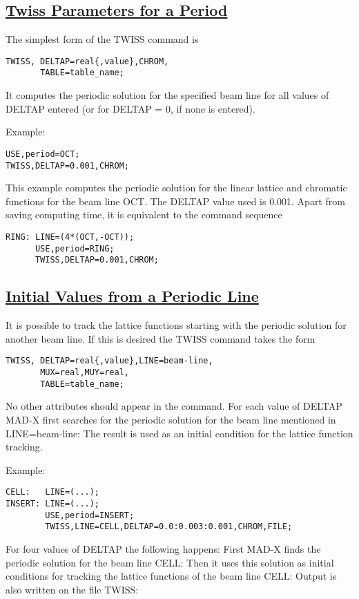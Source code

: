 \subsection{\href{periodic}{Twiss Parameters for a Period}} The simplest form of the TWISS command is 
\begin{verbatim}
TWISS, DELTAP=real{,value},CHROM,
       TABLE=table_name;
\end{verbatim} It computes the periodic solution for the specified beam line for all values of DELTAP entered (or for DELTAP = 0, if none is entered). 

Example: 
\begin{verbatim}
USE,period=OCT;
TWISS,DELTAP=0.001,CHROM;
\end{verbatim} This example computes the periodic solution for the linear lattice and chromatic functions for the beam line OCT. The DELTAP value used is 0.001. Apart from saving computing time, it is equivalent to the command sequence 
\begin{verbatim}
RING: LINE=(4*(OCT,-OCT));
      USE,period=RING;
      TWISS,DELTAP=0.001,CHROM;
\end{verbatim}

\subsection{\href{line}{Initial Values from a Periodic Line}} It is possible to track the lattice functions starting with the periodic solution for another beam line. If this is desired the TWISS command takes the form 
\begin{verbatim}
TWISS, DELTAP=real{,value},LINE=beam-line,
       MUX=real,MUY=real,
       TABLE=table_name;
\end{verbatim} No other attributes should appear in the command. For each value of DELTAP MAD-X first searches for the periodic solution for the beam line mentioned in LINE=beam-line: The result is used as an initial condition for the lattice function tracking. 

Example: 
\begin{verbatim}
CELL:   LINE=(...);
INSERT: LINE=(...);
        USE,period=INSERT;
        TWISS,LINE=CELL,DELTAP=0.0:0.003:0.001,CHROM,FILE;
\end{verbatim} For four values of DELTAP the following happens: First MAD-X finds the periodic solution for the beam line CELL: Then it uses this solution as initial conditions for tracking the lattice functions of the beam line CELL: Output is also written on the file TWISS: 

